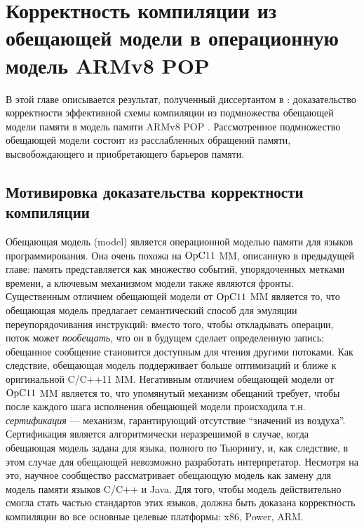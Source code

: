 \chapter{Корректность компиляции из обещающей модели в операционную модель ARMv8 POP}
\label{sec:armpop}

В этой главе описывается результат, полученный диссертантом в \cite{Podkopaev-al:ECOOP17}:
доказательство корректности эффективной схемы компиляции из
подмножества обещающей модели памяти \cite{Kang-al:POPL17} в модель памяти ARMv8 POP \cite{Flur-al:POPL16}.
Рассмотренное подмножество обещающей модели состоит из расслабленных обращений памяти,
высвобождающего и приобретающего барьеров памяти.


\section{Мотивировка доказательства корректности компиляции}
\label{sec:armpop:motive}
Обещающая модель (\Promise model) является операционной моделью памяти для языков программирования.
Она очень похожа на $\mathrm{OpC11}$ MM, описанную в предыдущей главе: память представляется как множество событий,
упорядоченных метками времени, а ключевым механизмом модели также являются фронты.
Существенным отличием обещающей модели от $\mathrm{OpC11}$ MM является то, что обещающая модель предлагает семантический
способ для эмуляции переупорядочивания инструкций:
вместо того, чтобы откладывать операции, поток может \emph{пообещать}, что он в будущем сделает определенную запись;
обещанное сообщение становится доступным для чтения другими потоками.
Как следствие, обещающая модель поддерживает больше оптимизаций и ближе к оригинальной C/C++11 MM.
Негативным отличием обещающей модели от $\mathrm{OpC11}$ MM является то, что упомянутый механизм обещаний требует, чтобы
после каждого шага исполнения обещающей модели происходила т.н. \emph{сертификация} --- механизм, гарантирующий
отсутствие ``значений из воздуха''. Сертификация является алгоритмически неразрешимой в случае, когда обещающая
модель задана для языка, полного по Тьюрингу, и, как следствие, в этом случае для обещающей невозможно
разработать интерпретатор.
Несмотря на это, научное сообщество рассматривает обещающую модель как замену для модель памяти языков C/C++ и Java.
Для того, чтобы модель действительно смогла стать частью стандартов этих языков, должна быть доказана корректность
компиляции во все основные целевые платформы: x86, Power, ARM.

